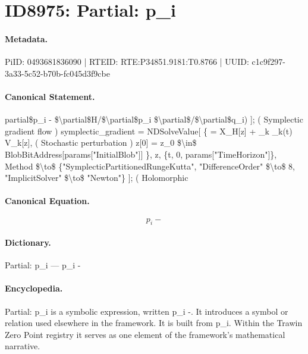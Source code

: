 \section*{ID8975: Partial: p\_i}
\paragraph{Metadata.}
PiID: 0493681836090 | RTEID: RTE:P34851.9181:T0.8766 | UUID: c1c9f297-3a33-5c52-b70b-fc045d3f9cbe

\paragraph{Canonical Statement.}
partial\$p\_i - \$\textbackslash{}partial\$H/\$\textbackslash{}partial\$p\_i \$\textbackslash{}partial\$/\$\textbackslash{}partial\$q\_i) ]; ( Symplectic gradient flow ) symplectic\_gradient = NDSolveValue[ \{ = X\_H[z] + \_k \_k(t) V\_k[z], ( Stochastic perturbation ) z[0] = z\_0 \$\textbackslash{}in\$ BlobBitAddress[params["InitialBlob"]] \}, z, \{t, 0, params["TimeHorizon"]\}, Method \$\textbackslash{}to\$ \{"SymplecticPartitionedRungeKutta", "DifferenceOrder" \$\textbackslash{}to\$ 8, "ImplicitSolver" \$\textbackslash{}to\$ "Newton"\} ]; ( Holomorphic

\paragraph{Canonical Equation.}
\[
p_i -
\]

\paragraph{Dictionary.}
Partial: p\_i — p\_i -

\paragraph{Encyclopedia.}
Partial: p\_i is a symbolic expression, written p\_i -. It introduces a symbol or relation used elsewhere in the framework. It is built from p\_i. Within the Trawin Zero Point registry it serves as one element of the framework's mathematical narrative.
